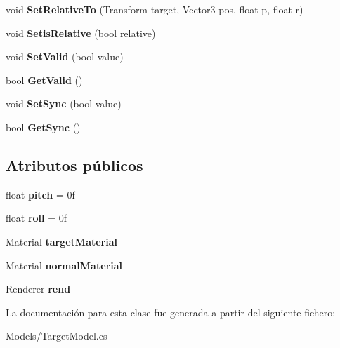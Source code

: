 \begin{DoxyCompactItemize}
void {\bfseries Set\+Relative\+To} (Transform target, Vector3 pos, float p, float r)
\item 
\mbox{\label{class_target_model_a6529efe1a8269e21f08730acf4115090}} 
void {\bfseries Setis\+Relative} (bool relative)
\item 
\mbox{\label{class_target_model_a2e4a1b3d4b27c14c3d2c7657af636b0f}} 
void {\bfseries Set\+Valid} (bool value)
\item 
\mbox{\label{class_target_model_a9bb012f5488eb24605440467601f3dfc}} 
bool {\bfseries Get\+Valid} ()
\item 
\mbox{\label{class_target_model_ab048bc78c22041dd77489f34d4cecf69}} 
void {\bfseries Set\+Sync} (bool value)
\item 
\mbox{\label{class_target_model_a6cb8e2993f269328e380670f9b545b80}} 
bool {\bfseries Get\+Sync} ()
\end{DoxyCompactItemize}
\subsection*{Atributos públicos}
\begin{DoxyCompactItemize}
\item 
\mbox{\label{class_target_model_a7586759a1d22048b40fa4f1cb0ec9b4a}} 
float {\bfseries pitch} = 0f
\item 
\mbox{\label{class_target_model_a3ce8f5a45b53a1996364e6e5e3663368}} 
float {\bfseries roll} = 0f
\item 
\mbox{\label{class_target_model_ae29e0799432fa79b04a4a2f9a5260ba3}} 
Material {\bfseries target\+Material}
\item 
\mbox{\label{class_target_model_a9944462b2a67606e945a45fea29b7650}} 
Material {\bfseries normal\+Material}
\item 
\mbox{\label{class_target_model_a0fde8af97987685b579466df499c8179}} 
Renderer {\bfseries rend}
\end{DoxyCompactItemize}


La documentación para esta clase fue generada a partir del siguiente fichero\+:\begin{DoxyCompactItemize}
\item 
Models/Target\+Model.\+cs\end{DoxyCompactItemize}
